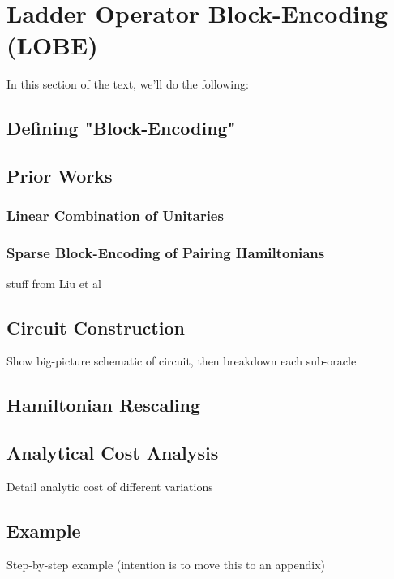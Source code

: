\section{Ladder Operator Block-Encoding (LOBE)}
\label{sec:lobe}

In this section of the text, we'll do the following:
\subsection{Defining "Block-Encoding"}
\label{subsec:block-encoding}

\subsection{Prior Works}
\label{subsec:prior-works}

\subsubsection{Linear Combination of Unitaries}

\subsubsection{Sparse Block-Encoding of Pairing Hamiltonians}
stuff from Liu et al

\subsection{Circuit Construction}
\label{subsec:circuit}
Show big-picture schematic of circuit, then breakdown each sub-oracle

\subsection{Hamiltonian Rescaling}
\label{subsec:rescaling}

\subsection{Analytical Cost Analysis}
\label{subsec:analytics}
Detail analytic cost of different variations

\subsection{Example}
\label{subsec:example}
Step-by-step example (intention is to move this to an appendix)

